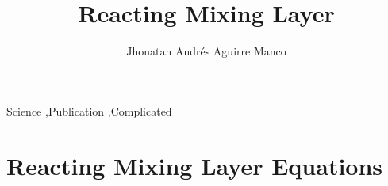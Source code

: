 \documentclass[preprint,12pt]{elsarticle}
\begin{document}
\begin{frontmatter}


\title{Reacting Mixing Layer}




\author{Jhonatan Andrés Aguirre Manco}

\address{Cachoeira Paulista, Brasil}

\begin{abstract}
\end{abstract}

\begin{keyword}
Science \sep Publication \sep Complicated


\end{keyword}

\end{frontmatter}

\linenumbers


\maketitle %

\section{Reacting Mixing Layer Equations}
%
\end{document}
